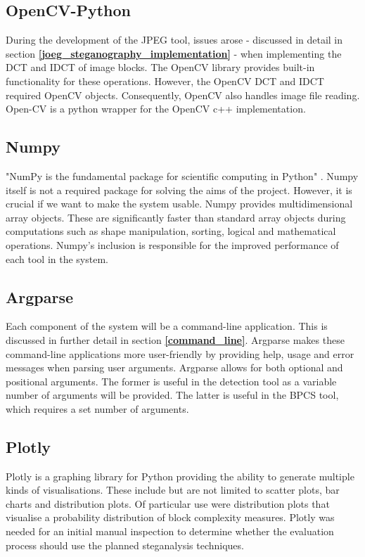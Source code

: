 \documentclass{l4proj}
\begin{document}
\subsection{OpenCV-Python}\label{opencv}

During the development of the JPEG tool, issues arose -  discussed in detail in section \textbf{\ref{joeg_steganography_implementation}} - when implementing the DCT and IDCT of image blocks. The OpenCV \citep{opencv} library provides built-in functionality for these operations. However, the OpenCV DCT and IDCT required OpenCV objects. Consequently, OpenCV also handles image file reading. Open-CV is a python wrapper for the OpenCV c++ implementation.

\subsection{Numpy}

"NumPy is the fundamental package for scientific computing in Python" \citep{numpy}. Numpy itself is not a required package for solving the aims of the project. However, it is crucial if we want to make the system usable. Numpy provides multidimensional array objects. These are significantly faster than standard array objects during computations such as shape manipulation, sorting, logical and mathematical operations. Numpy's inclusion is responsible for the improved performance of each tool in the system.

\subsection{Argparse}\label{argparse}

Each component of the system will be a command-line application. This is discussed in further detail in section \textbf{\ref{command_line}}. Argparse \citep{argparse} makes these command-line applications more user-friendly by providing help, usage and error messages when parsing user arguments. Argparse allows for both optional and positional arguments. The former is useful in the detection tool as a variable number of arguments will be provided. The latter is useful in the BPCS tool, which requires a set number of arguments.

\subsection{Plotly}

Plotly \citep{plotly} is a graphing library for Python providing the ability to generate multiple kinds of visualisations.  These include but are not limited to scatter plots, bar charts and distribution plots. Of particular use were distribution plots that visualise a probability distribution of block complexity measures. Plotly was needed for an initial manual inspection to determine whether the evaluation process should use the planned steganalysis techniques.
\end{document}
